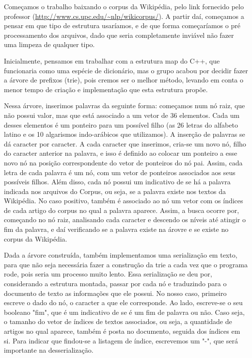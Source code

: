 \documentclass{article}
\begin{document}
Começamos o trabalho baixando o corpus da Wikipédia, pelo link fornecido pelo professor (\url{http://www.cs.upc.edu/~nlp/wikicorpus/}). A partir daí, começamos a pensar em que tipo de estrutura usaríamos, e de que forma começaríamos o pré processamento dos arquivos, dado que seria completamente inviável não fazer uma limpeza de qualquer tipo.

Inicialmente, pensamos em trabalhar com a estrutura map do C++, que funcionaria como uma espécie de dicionário, mas o grupo acabou por decidir fazer a árvore de prefixos (trie), pois cremos ser o melhor método, levando em conta o menor tempo de criação e implementação que esta estrutura propõe.

Nessa árvore, inserimos palavras da seguinte forma: começamos num nó raiz, que não possui valor, mas que está associado a um vetor de 36 elementos. Cada um desses elementos é um ponteiro para um possível filho (as 26 letras do alfabeto latino e os 10 algarismos indo-arábicos que utilizamos). A inserção de palavras se dá caracter por caracter. A cada caracter que inserimos, cria-se um novo nó, filho do caracter anterior na palavra, e isso é definido ao colocar um ponteiro a esse novo nó na posição correspondente do vetor de ponteiros do nó pai. Assim, cada letra de cada palavra é um nó, com um vetor de ponteiros associados aos seus possíveis filhos. Além disso, cada nó possui um indicativo de se há a palavra indicada nos arquivos do Corpus, ou seja, se a palavra existe nos textos da Wikipédia. No caso positivo, também é associado ao nó um vetor com os índices de cada artigo do corpus no qual a palavra aparece. Assim, a busca ocorre por, começando no nó raiz, analisando cada caracter e descendo os níveis até atingir o fim da palavra, e daí verificando se a palavra existe na árovre e se existe no corpus da Wikipédia.

Dada a árvore construída, também implementamos uma serialização em texto, para que não seja necessária fazer a construção da trie a cada vez que o programa rode, pois seria um processo muito lento. Essa serialização se deu por, considerando a estrutura montada, passar por cada nó e traduzindo para o documento de texto as informações que ele possui. No nosso caso, primeiro escreve o dado do nó, o caracter a que ele corresponde. Ao lado, escreve-se o seu booleano "fim", que é um indicativo de se é um fim de palavra ou não. Caso seja, o tamanho do vetor de índices de textos associados, ou seja, a quantidade de artigos no qual aparece, também é posta no documento, seguida dos índices em si. Para indicar que findou-se a listagem de índice, escrevemos um "-", que será importante na desserialização.
\end{document}
